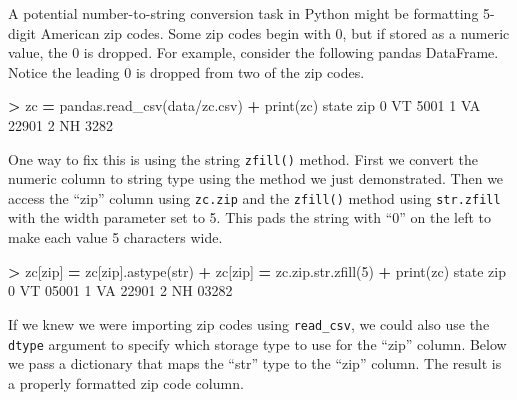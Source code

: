 \documentclass[
]{book}
\newenvironment{Shaded}{\begin{snugshade}}{\end{snugshade}}
\newcommand{\BuiltInTok}[1]{#1}
\newcommand{\DecValTok}[1]{\textcolor[rgb]{0.00,0.00,0.81}{#1}}
\newcommand{\NormalTok}[1]{#1}
\newcommand{\OperatorTok}[1]{\textcolor[rgb]{0.81,0.36,0.00}{\textbf{#1}}}
\newcommand{\StringTok}[1]{\textcolor[rgb]{0.31,0.60,0.02}{#1}}
\begin{document}
A potential number-to-string conversion task in Python might be formatting 5-digit American zip codes. Some zip codes begin with 0, but if stored as a numeric value, the 0 is dropped. For example, consider the following pandas DataFrame. Notice the leading 0 is dropped from two of the zip codes.

\begin{Shaded}
\begin{Highlighting}[]
\OperatorTok{\textgreater{}}\NormalTok{ zc }\OperatorTok{=}\NormalTok{ pandas.read\_csv(}\StringTok{\textquotesingle{}data/zc.csv\textquotesingle{}}\NormalTok{)}
\OperatorTok{+} \BuiltInTok{print}\NormalTok{(zc)}
\NormalTok{  state    }\BuiltInTok{zip}
\DecValTok{0}\NormalTok{    VT   }\DecValTok{5001}
\DecValTok{1}\NormalTok{    VA  }\DecValTok{22901}
\DecValTok{2}\NormalTok{    NH   }\DecValTok{3282}
\end{Highlighting}
\end{Shaded}

One way to fix this is using the string \texttt{zfill()} method. First we convert the numeric column to string type using the method we just demonstrated. Then we access the ``zip'' column using \texttt{zc.zip} and the \texttt{zfill()} method using \texttt{str.zfill} with the width parameter set to 5. This pads the string with ``0'' on the left to make each value 5 characters wide.

\begin{Shaded}
\begin{Highlighting}[]
\OperatorTok{\textgreater{}}\NormalTok{ zc[}\StringTok{\textquotesingle{}zip\textquotesingle{}}\NormalTok{] }\OperatorTok{=}\NormalTok{ zc[}\StringTok{\textquotesingle{}zip\textquotesingle{}}\NormalTok{].astype(}\BuiltInTok{str}\NormalTok{)}
\OperatorTok{+}\NormalTok{ zc[}\StringTok{\textquotesingle{}zip\textquotesingle{}}\NormalTok{] }\OperatorTok{=}\NormalTok{ zc.}\BuiltInTok{zip}\NormalTok{.}\BuiltInTok{str}\NormalTok{.zfill(}\DecValTok{5}\NormalTok{)}
\OperatorTok{+} \BuiltInTok{print}\NormalTok{(zc)}
\NormalTok{  state    }\BuiltInTok{zip}
\DecValTok{0}\NormalTok{    VT  }\DecValTok{05001}
\DecValTok{1}\NormalTok{    VA  }\DecValTok{22901}
\DecValTok{2}\NormalTok{    NH  }\DecValTok{03282}
\end{Highlighting}
\end{Shaded}

If we knew we were importing zip codes using \texttt{read\_csv}, we could also use the \texttt{dtype} argument to specify which storage type to use for the ``zip'' column. Below we pass a dictionary that maps the ``str'' type to the ``zip'' column. The result is a properly formatted zip code column.
\end{document}
